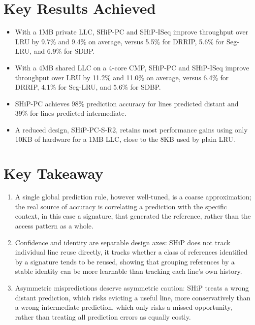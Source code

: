 \documentclass[10pt, conference]{IEEEtran}
\begin{document}
\section{Key Results Achieved}
\begin{itemize}[leftmargin=*, itemsep=0pt, topsep=1pt, parsep=0pt]
    \item With a 1MB private LLC, SHiP-PC and SHiP-ISeq improve throughput over LRU by 9.7\% and 9.4\% on average, versus 5.5\% for DRRIP, 5.6\% for Seg-LRU, and 6.9\% for SDBP.
    \item With a 4MB shared LLC on a 4-core CMP, SHiP-PC and SHiP-ISeq improve throughput over LRU by 11.2\% and 11.0\% on average, versus 6.4\% for DRRIP, 4.1\% for Seg-LRU, and 5.6\% for SDBP.
    \item SHiP-PC achieves 98\% prediction accuracy for lines predicted distant and 39\% for lines predicted intermediate.
    \item A reduced design, SHiP-PC-S-R2, retains most performance gains using only 10KB of hardware for a 1MB LLC, close to the 8KB used by plain LRU.
\end{itemize}

\section{Key Takeaway}
\begin{enumerate}[leftmargin=*, itemsep=0pt, topsep=1pt, parsep=0pt]
    \item A single global prediction rule, however well-tuned, is a coarse approximation; the real source of accuracy is correlating a prediction with the specific context, in this case a signature, that generated the reference, rather than the access pattern as a whole.
\end{enumerate}
\pagebreak
\begin{enumerate}[leftmargin=*, itemsep=0pt, topsep=1pt, parsep=0pt]
\setcounter{enumi}{1}
    \item Confidence and identity are separable design axes: SHiP does not track individual line reuse directly, it tracks whether a class of references identified by a signature tends to be reused, showing that grouping references by a stable identity can be more learnable than tracking each line's own history.
    \item Asymmetric mispredictions deserve asymmetric caution: SHiP treats a wrong distant prediction, which risks evicting a useful line, more conservatively than a wrong intermediate prediction, which only risks a missed opportunity, rather than treating all prediction errors as equally costly.
\end{enumerate}
\end{document}
